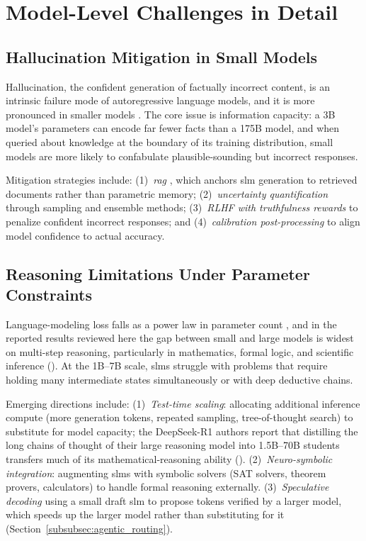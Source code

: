 
\section{Model-Level Challenges in Detail}
\label{supp:challenges}

\subsection{Hallucination Mitigation in Small Models}
\label{subsec:challenges_hallucination}

Hallucination, the confident generation of factually incorrect content, is an intrinsic failure mode of autoregressive language models, and it is more pronounced in smaller models \citep{zhang2023siren}. The core issue is information capacity: a 3B model's parameters can encode far fewer facts than a 175B model, and when queried about knowledge at the boundary of its training distribution, small models are more likely to confabulate plausible-sounding but incorrect responses.

Mitigation strategies include: (1)~\emph{\gls{rag}} \citep{lewis2020rag}, which anchors \gls{slm} generation to retrieved documents rather than parametric memory; (2)~\emph{uncertainty quantification} through sampling and ensemble methods; (3)~\emph{RLHF with truthfulness rewards} to penalize confident incorrect responses; and (4)~\emph{calibration post-processing} to align model confidence to actual accuracy.

\subsection{Reasoning Limitations Under Parameter Constraints}
\label{subsec:challenges_reasoning}

Language-modeling loss falls as a power law in parameter count \citep{kaplan2020scaling}, and in the reported results reviewed here the gap between small and large models is widest on multi-step reasoning, particularly in mathematics, formal logic, and scientific inference (\evD). At the 1B--7B scale, \glspl{slm} struggle with problems that require holding many intermediate states simultaneously or with deep deductive chains.

Emerging directions include: (1)~\emph{Test-time scaling}: allocating additional inference compute (more generation tokens, repeated sampling, tree-of-thought search) to substitute for model capacity; the DeepSeek-R1 authors \citep{deepseek2025r1} report that distilling the long chains of thought of their large reasoning model into 1.5B--70B students transfers much of its mathematical-reasoning ability (\evC). (2)~\emph{Neuro-symbolic integration}: augmenting \glspl{slm} with symbolic solvers (SAT solvers, theorem provers, calculators) to handle formal reasoning externally. (3)~\emph{Speculative decoding} \citep{leviathan2023speculative,chen2023specsampling} using a small draft \gls{slm} to propose tokens verified by a larger model, which speeds up the larger model rather than substituting for it (Section~\ref{subsubsec:agentic_routing}).


